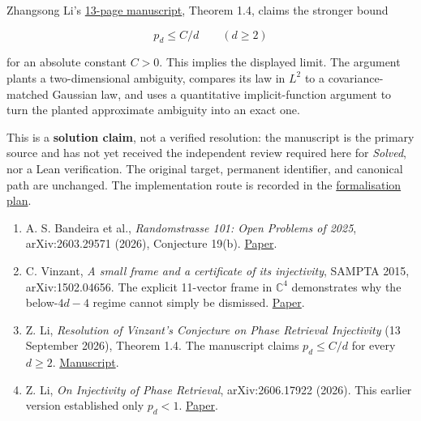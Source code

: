 \documentclass[11pt,a4paper]{article}
\makeatletter
\providecommand{\tightlist}{\setlength{\itemsep}{0pt}\setlength{\parskip}{0pt}}
\renewcommand{\subsection}{\Needspace{4\baselineskip}\@startsection{subsection}{2}{0pt}{9pt plus 1pt minus 1pt}{3pt}{\sffamily\bfseries\normalsize\color{ink}}}
\makeatother
\begin{document}
Zhangsong Li's
\href{https://zhangsong-li.github.io/injectivity_phase_retrieval.pdf}{13-page
manuscript}, Theorem 1.4, claims the stronger bound

\[p_d\leq C/d\qquad(d\geq2)\]

for an absolute constant \(C>0\). This implies the displayed limit. The
argument plants a two-dimensional ambiguity, compares its law in \(L^2\)
to a covariance-matched Gaussian law, and uses a quantitative
implicit-function argument to turn the planted approximate ambiguity
into an exact one.

This is a \textbf{solution claim}, not a verified resolution: the
manuscript is the primary source and has not yet received the
independent review required here for \textit{Solved}, nor a Lean
verification. The original target, permanent identifier, and canonical
path are unchanged. The implementation route is recorded in the
\href{https://github.com/ajt60gaibb/OpenProblemsInNLA/blob/main/frames-and-matrix-designs/FR-05/formalisation-plan.md}{formalisation
plan}.

\subsection{References}\label{references}

\begin{enumerate}
\def\labelenumi{\arabic{enumi}.}
\tightlist
\item
  A. S. Bandeira et al., \emph{Randomstrasse 101: Open Problems of
  2025}, arXiv:2603.29571 (2026), Conjecture 19(b).
  \href{https://arxiv.org/html/2603.29571v1}{Paper}.
\item
  C. Vinzant, \emph{A small frame and a certificate of its injectivity},
  SAMPTA 2015, arXiv:1502.04656. The explicit 11-vector frame in
  \(\mathbb C^4\) demonstrates why the below-\(4d-4\) regime cannot
  simply be dismissed. \href{https://arxiv.org/abs/1502.04656}{Paper}.
\item
  Z. Li, \emph{Resolution of Vinzant's Conjecture on Phase Retrieval
  Injectivity} (13 September 2026), Theorem 1.4. The manuscript claims
  \(p_d\le C/d\) for every \(d\ge2\).
  \href{https://zhangsong-li.github.io/injectivity_phase_retrieval.pdf}{Manuscript}.
\item
  Z. Li, \emph{On Injectivity of Phase Retrieval}, arXiv:2606.17922
  (2026). This earlier version established only \(p_d<1\).
  \href{https://arxiv.org/abs/2606.17922}{Paper}.
\end{enumerate}
\end{document}
